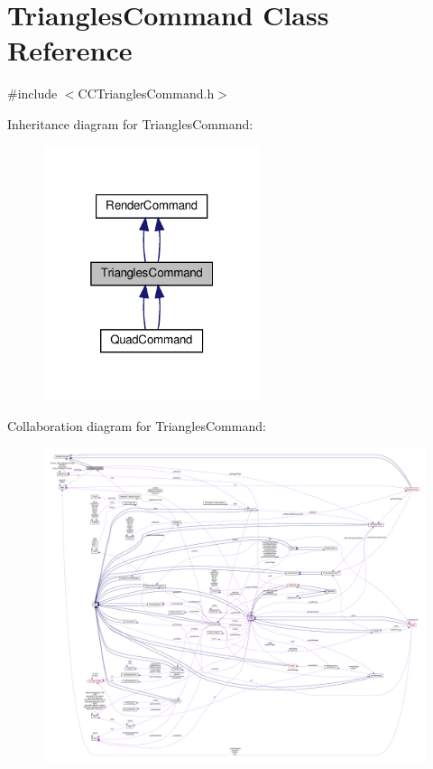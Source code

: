 \hypertarget{classTrianglesCommand}{}\section{Triangles\+Command Class Reference}
\label{classTrianglesCommand}


{\ttfamily \#include $<$C\+C\+Triangles\+Command.\+h$>$}



Inheritance diagram for Triangles\+Command\+:
\nopagebreak
\begin{figure}[H]
\begin{center}
\leavevmode
\includegraphics[width=181pt]{classTrianglesCommand__inherit__graph}
\end{center}
\end{figure}


Collaboration diagram for Triangles\+Command\+:
\nopagebreak
\begin{figure}[H]
\begin{center}
\leavevmode
\includegraphics[width=350pt]{classTrianglesCommand__coll__graph}
\end{center}
\end{figure}
